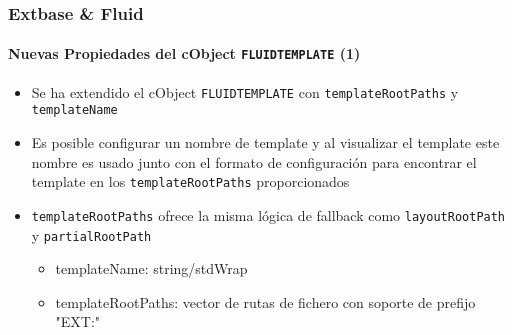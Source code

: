 \begin{frame}[fragile]
	\frametitle{Extbase \& Fluid}
	\framesubtitle{Nuevas Propiedades del cObject \texttt{FLUIDTEMPLATE} (1)}

	\begin{itemize}

		\item Se ha extendido el cObject \texttt{FLUIDTEMPLATE} con
			\texttt{templateRootPaths} y \texttt{templateName}

		\item Es posible configurar un nombre de template y al visualizar el template este
			nombre es usado junto con el formato de configuración para encontrar el template en los
			\texttt{templateRootPaths} proporcionados

		\item \texttt{templateRootPaths} ofrece la misma lógica de fallback como
			\texttt{layoutRootPath} y \texttt{partialRootPath}

			\begin{itemize}
				\item templateName: string/stdWrap
				\item templateRootPaths: vector de rutas de fichero con soporte de prefijo "EXT:"
			\end{itemize}

	\end{itemize}

\end{frame}


